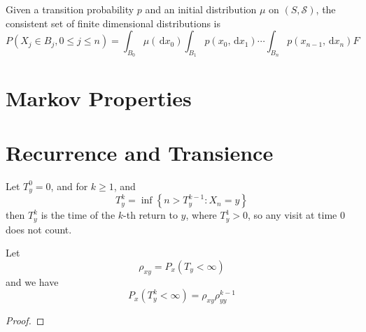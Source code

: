 \begin{remark}
    Given a transition probability $p$ and an initial distribution $\mu$ on $(S,\mathcal{S})$, the consistent set of finite dimensional distributions is
    \begin{equation}
        P\left(X_{j}\in B_{j},0\leq j\leq n\right)=\int_{B_{0}}\mu\left(\,\mathrm{d}x_{0}\right)\int_{B_{1}}p\left(x_{0},\,\mathrm{d}x_{1}\right)\cdots\int_{B_{n}}p\left(x_{n-1},\,\mathrm{d}x_{n}\right)
        F    \end{equation}
\end{remark}

\section{Markov Properties}

\begin{theorem}

\end{theorem}

\begin{corollary}

\end{corollary}

\begin{theorem}

\end{theorem}

\section{Recurrence and Transience}

Let $T_{y}^{0}=0$, and for $k\geq 1$, and
\begin{equation}
    T_{y}^{k}=\inf\left\{n>T_{y}^{k-1}:X_{n}=y\right\}
\end{equation}
then $T_{y}^{k}$ is the time of the $k$-th return to $y$, where $T_{y}^{1}>0$, so any visit at time 0 does not count.

Let
\begin{equation}
    \rho_{x y}=P_{x}\left(T_{y}<\infty\right)
\end{equation}
and we have
\begin{equation}
    P_{x}\left(T_{y}^{k}<\infty\right)=\rho_{xy}\rho_{yy}^{k-1}
\end{equation}

\begin{proof}

\end{proof}

